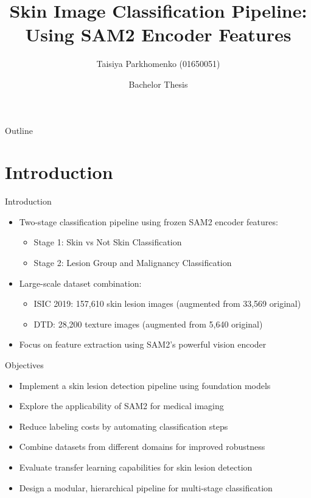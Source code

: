 \documentclass[aspectratio=169]{beamer}
\title[Skin Image Classification]{Skin Image Classification Pipeline:\\Using SAM2 Encoder Features}
\author{Taisiya Parkhomenko (01650051)}
\date{Bachelor Thesis}
\institute{Institute of Visual Computing (IVC)}
\begin{document}
\begin{frame}[plain]
  \maketitle
\end{frame}


\begin{frame}{Outline}
  \tableofcontents
\end{frame}


\section{Introduction}

\begin{frame}{Introduction}
  \begin{itemize}
    \item Two-stage classification pipeline using frozen SAM2 encoder features:
      \begin{itemize}
        \item Stage 1: Skin vs Not Skin Classification
        \item Stage 2: Lesion Group and Malignancy Classification
      \end{itemize}
    \item Large-scale dataset combination:
      \begin{itemize}
        \item ISIC 2019: 157,610 skin lesion images (augmented from 33,569 original)
        \item DTD: 28,200 texture images (augmented from 5,640 original)
      \end{itemize}
    \item Focus on feature extraction using SAM2's powerful vision encoder
  \end{itemize}
\end{frame}

\begin{frame}{Objectives}
  \begin{itemize}
    \item Implement a skin lesion detection pipeline using foundation models
    \item Explore the applicability of SAM2 for medical imaging
    \item Reduce labeling costs by automating classification steps
    \item Combine datasets from different domains for improved robustness
    \item Evaluate transfer learning capabilities for skin lesion detection
    \item Design a modular, hierarchical pipeline for multi-stage classification
  \end{itemize}
\end{frame}
\end{document}
